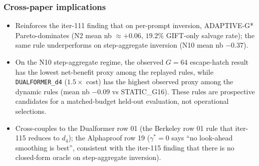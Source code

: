 \subsubsection*{Cross-paper implications}
\begin{itemize}
\item Reinforces the iter-111 finding that on per-prompt inversion,
  ADAPTIVE-G* Pareto-dominates (N2 mean nb $\approx+0.06$,
  $19.2\%$ GIFT-only salvage rate); the same rule underperforms on
  step-aggregate inversion (N10 mean nb $-0.37$).
\item On the N10 step-aggregate regime, the observed $G=64$ escape-hatch
  result has the lowest net-benefit proxy among the replayed rules, while
  \texttt{DUALFORMER\_d4} ($1.5\times$ cost) has the highest observed
  proxy among the dynamic rules (mean nb $-0.09$ vs STATIC\_G16).  These
  rules are prospective candidates for a matched-budget held-out evaluation,
  not operational selections.
\item Cross-couples to the Dualformer row 01 (the Berkeley row 01
  rule that iter-115 reduces to $d_4$); the Alphaproof row 19
  ($\gamma^*=0$ says ``no look-ahead smoothing is best'', consistent
  with the iter-115 finding that there is no closed-form oracle on
  step-aggregate inversion).
\end{itemize}
